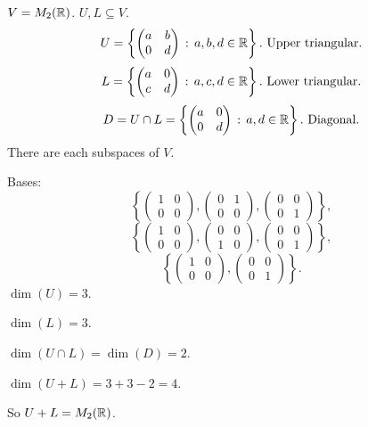 \documentclass[10pt, a4paper]{article}
\begin{document}
\begin{example}
    $V = M_2(\mathbb{R})$.
    $U, L \subseteq V$.
    \[
    U = \left\{\begin{pmatrix}
        a & b \\ 0 & d
    \end{pmatrix}\,:\, a, b, d \in \mathbb{R}\right\}. \text{ Upper triangular.}
    \]
    \[
    L = \left\{\begin{pmatrix}
        a & 0 \\ c & d
    \end{pmatrix}\,:\, a, c, d \in \mathbb{R}\right\}. \text{ Lower triangular.}
    \]
    \[
    D = U \cap L = \left\{\begin{pmatrix}
        a & 0 \\ 0 & d
    \end{pmatrix}\,:\, a, d \in \mathbb{R}\right\}. \text{ Diagonal.}
    \]
    There are each subspaces of $V$.

    Bases:
    \[
    \left\{\begin{pmatrix}
        1 & 0 \\ 0 & 0
    \end{pmatrix}, \begin{pmatrix}
        0 & 1 \\ 0 & 0
    \end{pmatrix}, \begin{pmatrix}
        0 & 0 \\ 0 & 1
    \end{pmatrix}\right\},
    \]
    \[
    \left\{\begin{pmatrix}
        1 & 0 \\ 0 & 0
    \end{pmatrix}, \begin{pmatrix}
        0 & 0 \\ 1 & 0
    \end{pmatrix}, \begin{pmatrix}
        0 & 0 \\ 0 & 1
    \end{pmatrix}\right\},
    \]
    \[
    \left\{\begin{pmatrix}
        1 & 0 \\ 0 & 0
    \end{pmatrix}, \begin{pmatrix}
        0 & 0 \\ 0 & 1
    \end{pmatrix}\right\}.
    \]
    $\dim(U) = 3$.

    $\dim(L) = 3$.

    $\dim(U \cap L) = \dim(D) = 2$.

    $\dim(U + L) = 3 + 3 - 2 = 4$.

    So $U + L = M_2(\mathbb{R})$.
\end{example}
\end{document}
